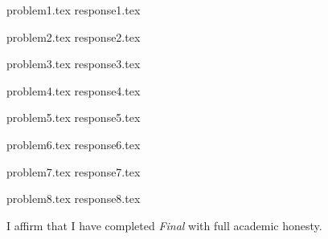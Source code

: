 \documentclass[letterpaper, 12pt]{article}
\begin{document}

% 
{problem1.tex}
{response1.tex}

% 
{problem2.tex}
{response2.tex}

% 
{problem3.tex}
{response3.tex}

% 
{problem4.tex}
{response4.tex}

{problem5.tex}
{response5.tex}

% 
{problem6.tex}
{response6.tex}

{problem7.tex}
{response7.tex}

{problem8.tex}
{response8.tex}


\par

I affirm that I have completed \textit{Final} with full academic honesty.
\end{document}

